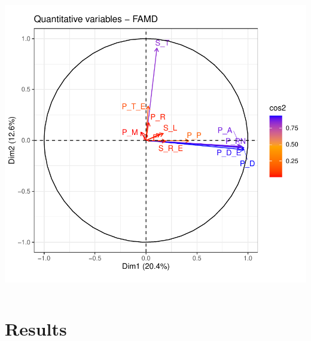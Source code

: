 \documentclass[compress]{beamer}
\begin{document}
\begin{frame}
\begin{columns}
\begin{center}
\includegraphics[width=0.7\linewidth]{Pic/FAMD_quantitative_variables.pdf}
\end{center}
\end{columns}
\end{frame}

\section{Results}
\end{document}
